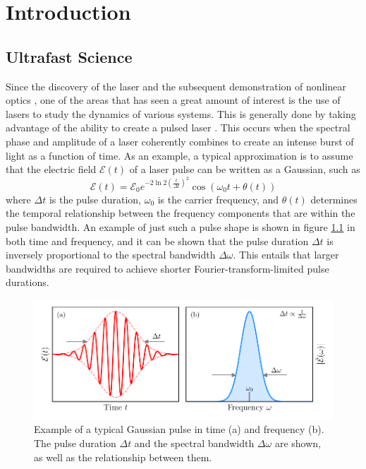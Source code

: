 \chapter{Introduction}
\label{chap:Intro}


\section{Ultrafast Science}

Since the discovery of the laser \cite{schawlowInfraredOpticalMasers1958, maimanStimulatedOpticalRadiation1960} and the subsequent demonstration of nonlinear optics \cite{frankenGenerationOpticalHarmonics1961, armstrongInteractionsLightWaves1962}, one of the areas that has seen a great amount of interest is the use of lasers to study the dynamics of various systems.  This is generally done by taking advantage of the ability to create a pulsed laser \cite{demariaPicosecondLaserPulses1971}.  This occurs when the spectral phase and amplitude of a laser coherently combines to create an intense burst of light as a function of time.  As an example, a typical approximation is to assume that the electric field $\mathcal{E}(t)$ of a laser pulse can be written as a Gaussian, such as
\begin{equation}
	\label{eqn:gaussian_pulse}
	\mathcal{E}(t) = \mathcal{E}_0 e^{-2\ln 2(\frac{t}{\Delta t})^2}\cos(\omega_0 t + \theta(t))
\end{equation}
where $\Delta t$ is the pulse duration, $\omega_0$ is the carrier frequency, and $\theta(t)$ determines the temporal relationship between the frequency components that are within the pulse bandwidth.  An example of just such a pulse shape is shown in figure \ref{fig:gaussian_pulse} in both time and frequency, and it can be shown that the pulse duration $\Delta t$ is inversely proportional to the spectral bandwidth $\Delta\omega$.  This entails that larger bandwidths are required to achieve shorter Fourier-transform-limited pulse durations.

\begin{figure}
	\centering
	\includegraphics[width=1.0\textwidth]{figures/Introduction/gaussian_pulse.pdf}
	\caption[Example of a typical Gaussian pulse in time and frequency]{Example of a typical Gaussian pulse in time (a) and frequency (b).  The pulse duration $\Delta t$ and the spectral bandwidth $\Delta\omega$ are shown, as well as the relationship between them.}
	\label{fig:gaussian_pulse}
\end{figure}

